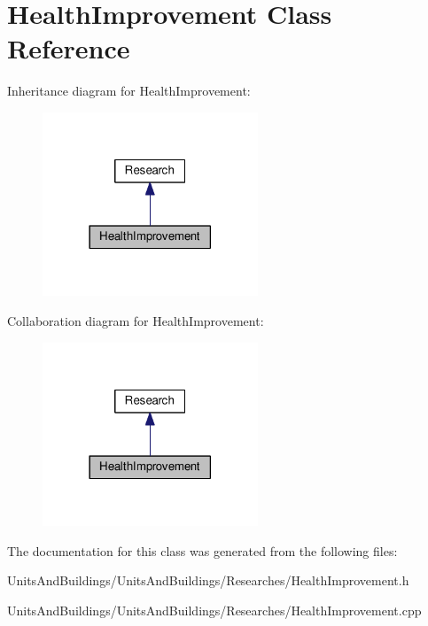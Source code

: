 \hypertarget{class_health_improvement}{}\section{Health\+Improvement Class Reference}
\label{class_health_improvement}


Inheritance diagram for Health\+Improvement\+:
\nopagebreak
\begin{figure}[H]
\begin{center}
\leavevmode
\includegraphics[width=182pt]{class_health_improvement__inherit__graph}
\end{center}
\end{figure}


Collaboration diagram for Health\+Improvement\+:
\nopagebreak
\begin{figure}[H]
\begin{center}
\leavevmode
\includegraphics[width=182pt]{class_health_improvement__coll__graph}
\end{center}
\end{figure}


The documentation for this class was generated from the following files\+:\begin{DoxyCompactItemize}
\item 
Units\+And\+Buildings/\+Units\+And\+Buildings/\+Researches/Health\+Improvement.\+h\item 
Units\+And\+Buildings/\+Units\+And\+Buildings/\+Researches/Health\+Improvement.\+cpp\end{DoxyCompactItemize}

